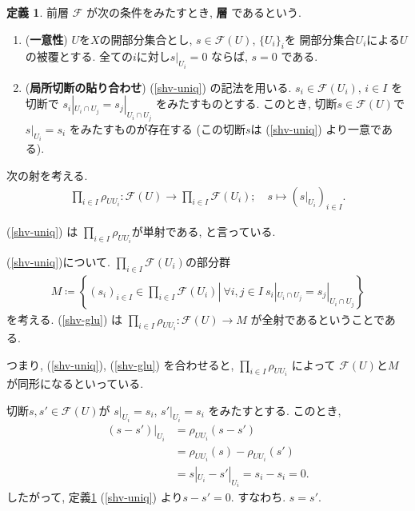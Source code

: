 \documentclass[12pt, a4paper, dvipdfmx]{jsarticle}
\makeatletter
\theoremstyle{definition}
\newtheorem{Definition}[Axiom]{定義}
\newcommand{\F}{\mathcal{F}}
\numberwithin{equation}{section} %
\renewenvironment{proof}[1][\proofname]{\par
  \normalfont
  \topsep6\p@\@plus6\p@ \trivlist
  \item[\hskip\labelsep{\textbf{#1}}\@addpunct{\textbf{. }}]\ignorespaces
}{%
  \endtrivlist
}
\renewcommand{\proofname}{証明}
\makeatother
\begin{document}
\begin{Definition}\label{def-shv}
    前層 $\F$ が次の条件をみたすとき, \textbf{層} であるという. 
    \begin{enumerate}
        \renewcommand{\labelenumi}{({\arabic{enumi}})}
        \setcounter{enumi}{3}
        \item (\textbf{一意性})\label{shv-uniq}
        $U$を$X$の開部分集合とし, 
        $s\in \F(U)$, $\{U_i\}_i$を
        開部分集合$U_i$による$U$ の被覆とする. 
        全ての$i$に対し$s|_{U_i} = 0$ ならば, $s = 0$
        である. 
        \item (\textbf{局所切断の貼り合わせ})\label{shv-glu}
        (\ref{shv-uniq}) の記法を用いる. 
        $s_i\in \F(U_i)$, $i\in I$
        を切断で
        $s_i|_{U_i\cap U_j} = s_j|_{U_i\cap U_j}$
        をみたすものとする. 
        このとき, 切断$s\in \F(U)$で
        $s|_{U_i} = s_i$
        をみたすものが存在する 
        (この切断$s$は (\ref{shv-uniq}) より一意である). 
    \end{enumerate}
\end{Definition}

\begin{proof}[定義\ref{def-shv}は何を言っているのか] 
    次の射を考える. 
    \begin{align*}
        \prod_{i\in I}\rho_{UU_i} \colon 
        \F(U)\to \prod_{i\in I}\F(U_i);
        \quad 
        s\mapsto (s|_{U_i})_{i\in I}.
    \end{align*}

    (\ref{shv-uniq}) は
    $\prod_{i\in I} \rho_{UU_i}$が単射である, と言っている. 
    
    (\ref{shv-uniq})について. 
    $\prod_{i\in I}\F(U_i)$の部分群
    \begin{align*}
        M \coloneqq \left\{\left.
            (s_i)_{i\in I} \in \prod_{i\in I}\F(U_i) 
            \right|\ \forall i,j\in I \ 
            s_i|_{U_i\cap U_j} = s_j|_{U_i\cap U_j} \right\}
    \end{align*}
    を考える. (\ref{shv-glu}) は
    $\prod_{i\in I}\rho_{UU_i}\colon \F(U)\to M$
    が全射であるということである. 

    つまり, (\ref{shv-uniq}), (\ref{shv-glu}) を合わせると, 
    $\prod_{i\in I}\rho_{UU_i}$ によって 
    $\F(U)$と$M$が同形になるといっている.
\end{proof}

\begin{proof}[定義\ref{def-shv} (\ref{shv-glu}) の一意性の証明] 
    切断$s, s' \in \F(U)$が
    $s|_{U_i} = s_i$, $s'|_{U_i} = s_i$
    をみたすとする. このとき, 
    \begin{align*}
        (s-s')|_{U_i} 
        &= \rho_{UU_i}(s-s') \\
        &= \rho_{UU_i}(s) - \rho_{UU_i}(s')\\
        &= s|_{U_i} - s'|_{U_i} = s_i - s_i = 0. 
    \end{align*}
    したがって, 定義\ref{def-shv} (\ref{shv-uniq}) より$s-s' = 0$. 
    すなわち. $s = s'$.
\end{proof}
\end{document}
